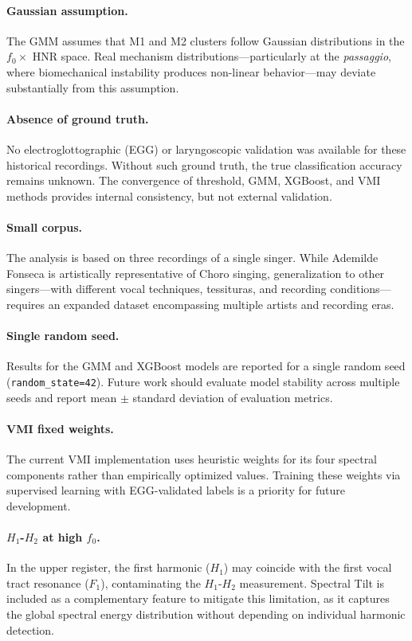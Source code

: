 \documentclass[review,3p,number]{elsarticle}
\begin{document}
\paragraph{Gaussian assumption.}
The GMM assumes that M1 and M2 clusters follow Gaussian distributions in the
$f_0 \times$ HNR space. Real mechanism distributions---particularly at the
\emph{passaggio}, where biomechanical instability produces non-linear
behavior---may deviate substantially from this assumption.

\paragraph{Absence of ground truth.}
No electroglottographic (EGG) or laryngoscopic validation was available for these
historical recordings. Without such ground truth, the true classification accuracy
remains unknown. The convergence of threshold, GMM, XGBoost, and VMI methods provides
internal consistency, but not external validation.

\paragraph{Small corpus.}
The analysis is based on three recordings of a single singer. While Ademilde Fonseca
is artistically representative of Choro singing, generalization to other
singers---with different vocal techniques, tessituras, and recording
conditions---requires an expanded dataset encompassing multiple artists and
recording eras.

\paragraph{Single random seed.}
Results for the GMM and XGBoost models are reported for a single random seed
(\texttt{random\_state=42}). Future work should evaluate model stability across
multiple seeds and report mean $\pm$ standard deviation of evaluation metrics.

\paragraph{VMI fixed weights.}
The current VMI implementation uses heuristic weights for its four spectral
components rather than empirically optimized values. Training these weights via
supervised learning with EGG-validated labels is a priority for future development.

\paragraph{$H_1$-$H_2$ at high $f_0$.}
In the upper register, the first harmonic ($H_1$) may coincide with the
first vocal tract resonance ($F_1$), contaminating the $H_1$-$H_2$
measurement.\cite{kreiman2012} Spectral Tilt is included as a complementary feature
to mitigate this limitation, as it captures the global spectral energy distribution
without depending on individual harmonic detection.
\end{document}
